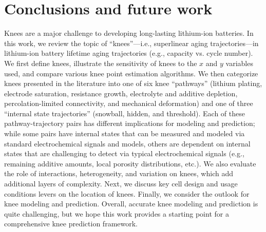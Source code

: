 \documentclass[journal=jpclcd,manuscript=article]{achemso}
\begin{document}


\section{Conclusions and future work}

Knees are a major challenge to developing long-lasting lithium-ion batteries.
In this work, we review the topic of ``knees''---i.e., superlinear aging trajectories---in lithium-ion battery lifetime aging trajectories (e.g., capacity vs. cycle number). We first define knees, illustrate the sensitivity of knees to the $x$ and $y$ variables used, and compare various knee point estimation algorithms. We then categorize knees presented in the literature into one of six knee ``pathways'' (lithium plating, electrode saturation, resistance growth, electrolyte and additive depletion, percolation-limited connectivity, and mechanical deformation) and one of three ``internal state trajectories'' (snowball, hidden, and threshold). Each of these pathway-trajectory pairs has different implications for modeling and prediction; while some pairs have internal states that can be measured and modeled via standard electrochemical signals and models, others are dependent on internal states that are challenging to detect via typical electrochemical signals (e.g., remaining additive amounts, local porosity distributions, etc.). We also evaluate the role of interactions, heterogeneity, and variation on knees, which add additional layers of complexity. Next, we discuss key cell design and usage conditions levers on the location of knees. Finally, we consider the outlook for knee modeling and prediction. Overall, accurate knee modeling and prediction is quite challenging, but we hope this work provides a starting point for a comprehensive knee prediction framework.
\end{document}
